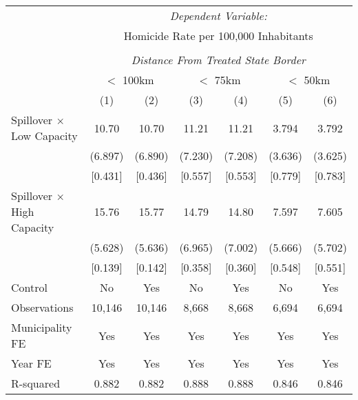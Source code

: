 \documentclass[]{article}
\begin{document}
\begin{adjustbox}{max width=\textwidth}
\begin{tabular}{lcccccc}
\toprule
& \multicolumn{6}{c}{\textit{Dependent Variable:}} \\
& \multicolumn{6}{c}{Homicide Rate per 100,000 Inhabitants} \\
\cmidrule{2-7} \\
& \multicolumn{6}{c}{\textit{Distance From Treated State Border}} \\
\cmidrule{2-7}
& \multicolumn{2}{c}{$<$ 100km} & \multicolumn{2}{c}{$<$ 75km} & \multicolumn{2}{c}{$<$ 50km} \\
\cmidrule(lr){2-3} \cmidrule(lr){4-5} \cmidrule(lr){6-7}
& (1) & (2) & (3) & (4) & (5) & (6) \\
\midrule
Spillover $\times$ Low Capacity & 10.70 & 10.70 & 11.21 & 11.21 & 3.794 & 3.792 \\
& (6.897) & (6.890) & (7.230) & (7.208) & (3.636) & (3.625) \\
& [0.431] & [0.436] & [0.557] & [0.553] & [0.779] & [0.783] \\
[0.5em]
Spillover $\times$ High Capacity & 15.76 & 15.77 & 14.79 & 14.80 & 7.597 & 7.605 \\
& (5.628) & (5.636) & (6.965) & (7.002) & (5.666) & (5.702) \\
& [0.139] & [0.142] & [0.358] & [0.360] & [0.548] & [0.551] \\
[0.5em]
\midrule
Control & No & Yes & No & Yes & No & Yes \\
Observations & 10,146 & 10,146 & 8,668 & 8,668 & 6,694 & 6,694 \\
Municipality FE & Yes & Yes & Yes & Yes & Yes & Yes \\
Year FE & Yes & Yes & Yes & Yes & Yes & Yes \\
R-squared & 0.882 & 0.882 & 0.888 & 0.888 & 0.846 & 0.846 \\
\bottomrule
\end{tabular}
\end{adjustbox}
\end{document}
